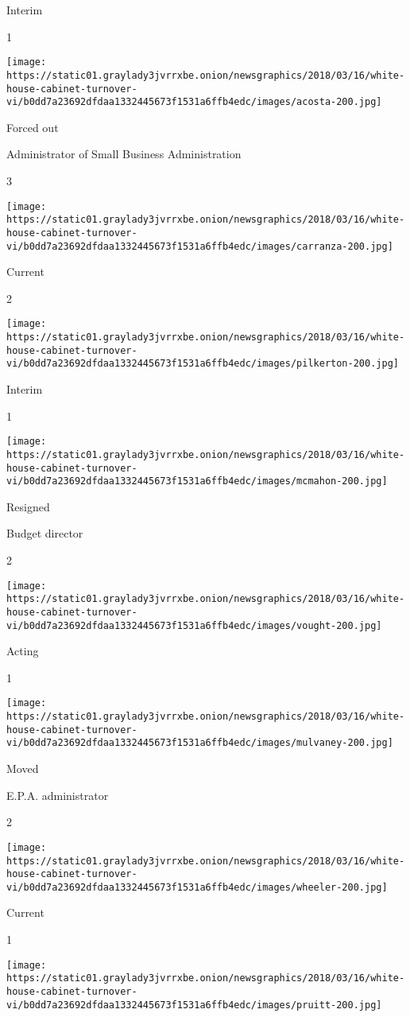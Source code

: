 Interim

1

\texttt{[image: https://static01.graylady3jvrrxbe.onion/newsgraphics/2018/03/16/white-house-cabinet-turnover-vi/b0dd7a23692dfdaa1332445673f1531a6ffb4edc/images/acosta-200.jpg]}

Forced out

Administrator of Small Business Administration

3

\texttt{[image: https://static01.graylady3jvrrxbe.onion/newsgraphics/2018/03/16/white-house-cabinet-turnover-vi/b0dd7a23692dfdaa1332445673f1531a6ffb4edc/images/carranza-200.jpg]}

Current

2

\texttt{[image: https://static01.graylady3jvrrxbe.onion/newsgraphics/2018/03/16/white-house-cabinet-turnover-vi/b0dd7a23692dfdaa1332445673f1531a6ffb4edc/images/pilkerton-200.jpg]}

Interim

1

\texttt{[image: https://static01.graylady3jvrrxbe.onion/newsgraphics/2018/03/16/white-house-cabinet-turnover-vi/b0dd7a23692dfdaa1332445673f1531a6ffb4edc/images/mcmahon-200.jpg]}

Resigned

Budget director

2

\texttt{[image: https://static01.graylady3jvrrxbe.onion/newsgraphics/2018/03/16/white-house-cabinet-turnover-vi/b0dd7a23692dfdaa1332445673f1531a6ffb4edc/images/vought-200.jpg]}

Acting

1

\texttt{[image: https://static01.graylady3jvrrxbe.onion/newsgraphics/2018/03/16/white-house-cabinet-turnover-vi/b0dd7a23692dfdaa1332445673f1531a6ffb4edc/images/mulvaney-200.jpg]}

Moved

E.P.A. administrator

2

\texttt{[image: https://static01.graylady3jvrrxbe.onion/newsgraphics/2018/03/16/white-house-cabinet-turnover-vi/b0dd7a23692dfdaa1332445673f1531a6ffb4edc/images/wheeler-200.jpg]}

Current

1

\texttt{[image: https://static01.graylady3jvrrxbe.onion/newsgraphics/2018/03/16/white-house-cabinet-turnover-vi/b0dd7a23692dfdaa1332445673f1531a6ffb4edc/images/pruitt-200.jpg]}

